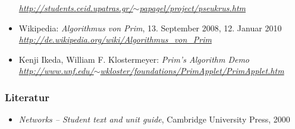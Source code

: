 \documentclass[a4paper,titlepage]{article}
\begin{document}
\begin{itemize}
	\emph{\href{http://students.ceid.upatras.gr/~papagel/project/pseukrus.htm}{http://students.ceid.upatras.gr/$\sim$papagel/project/pseukrus.htm}}
\item Wikipedia: \emph{Algorithmus von Prim}, 13. September 2008, 12. Januar 2010 \\
	\emph{\href{http://de.wikipedia.org/wiki/Algorithmus_von_Prim}{http://de.wikipedia.org/wiki/Algorithmus\_von\_Prim}}
\item Kenji Ikeda, William F. Klostermeyer: \emph{Prim's Algorithm Demo} \\
	\emph{\href{http://www.unf.edu/~wkloster/foundations/PrimApplet/PrimApplet.htm}{http://www.unf.edu/$\sim$wkloster/foundations/PrimApplet/PrimApplet.htm}}
\end{itemize}

\subsubsection{Literatur}
\begin{itemize}
\item \emph{Networks -- Student text and unit guide}, Cambridge University Press, 2000
\end{itemize}
\end{document}
